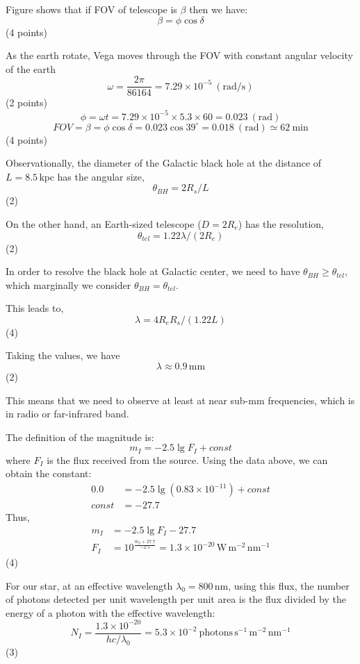 
Figure shows that if FOV of telescope is $\beta$ then we have:
\[ \beta = \phi\cos\delta \]
\hfill(4 points)

As the earth rotate, Vega moves through the FOV with constant angular
velocity of the earth
\[
\omega = \frac{2\pi}{86164} = 7.29 \times 10^{-5}\ (\mathrm{rad/s})
\]
\hfill(2 points)
\[
\phi = \omega t = 7.29 \times 10^{-5} \times 5.3 \times 60 = 0.023\ \mathrm{(rad)}
\]
\[
FOV = \beta = \phi\cos\delta = 0.023\cos 39^\circ
 = 0.018\ \mathrm{(rad)} \simeq 62\ \mathrm{min}
\]
\hfill(4 points)

Observationally, the diameter of the Galactic black hole at the distance of
$L = 8.5\,\mathrm{kpc}$ has the angular size,
\[
\theta_{BH} = 2R_s/L
\]
\hfill(2)

On the other hand, an Earth-sized telescope ($D = 2R_e$) has the resolution,
\[
\theta_{tel} = 1.22\lambda/(2R_e)
\]
\hfill(2)

In order to resolve the black hole at Galactic center, we need to have
$\theta_{BH} \geq \theta_{tel}$, which marginally we consider
$\theta_{BH} = \theta_{tel}$.

This leads to,
\[
\lambda = 4R_e R_s/(1.22L)
\]
\hfill(4)

Taking the values, we have
\[
\lambda \approx 0.9\,\mathrm{mm}
\]
\hfill(2)

This means that we need to observe at least at near sub-mm frequencies, which
is in radio or far-infrared band.

The definition of the magnitude is:
\[
m_I = -2.5\lg F_I + const
\]
where $F_I$ is the flux received from the source. Using the data above, we can
obtain the constant:
\begin{align*}
0.0 &= -2.5\lg(0.83 \times 10^{-11}) + const\\
const &= -27.7
\end{align*}
Thus,
\begin{align*}
m_I &= -2.5\lg F_I - 27.7\\
F_I &= 10^{\frac{m_I + 27.7}{-2.5}}
  = 1.3 \times 10^{-20}\,\mathrm{W\,m^{-2}\,nm^{-1}}
\end{align*}
\hfill(4)

For our star, at an effective wavelength $\lambda_0 = 800$\,nm, using this
flux, the number of photons detected per unit wavelength per unit area is the
flux divided by the energy of a photon with the effective wavelength:
\[
N_I = \frac{1.3 \times 10^{-20}}{hc/\lambda_0}
 = 5.3 \times 10^{-2}\ \mathrm{photons\,s^{-1}\,m^{-2}\,nm^{-1}}
\]
\hfill(3)

